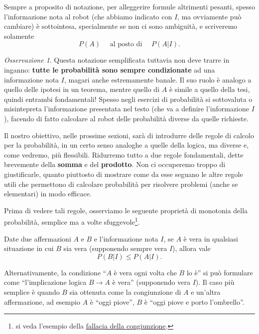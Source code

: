 \documentclass[
  italian,
  letterpaper,
]{book}
\theoremstyle{definition}
\theoremstyle{remark}
\newtheorem*{remark}{Osservazione}
\begin{document}
Sempre a proposito di notazione, per alleggerire formule altrimenti
pesanti, spesso l'informazione nota al robot (che abbiamo indicato con
\(I\), ma ovviamente può cambiare) è sottointesa, specialmente se non ci
sono ambiguità, e scriveremo solamente
\[ P(A) \quad \text{ al posto di } \quad  P(A|I).\]

\begin{remark}
Questa notazione semplificata tuttavia non deve trarre in inganno:
\textbf{tutte le probabilità sono sempre condizionate} ad una
informazione nota \(I\), magari anche estremamente banale. Il suo ruolo
è analogo a quello delle ipotesi in un teorema, mentre quello di \(A\) è
simile a quello della tesi, quindi entrambi fondamentali! Spesso negli
esercizi di probabilità si sottovaluta o misintepreta l'informazione
presentata nel testo (che va a definire l'informazione \(I\)), facendo
di fatto calcolare al robot delle probabilità diverse da quelle
richieste.
\end{remark}

Il nostro obiettivo, nelle prossime sezioni, sarà di introdurre delle
regole di calcolo per la probabilità, in un certo senso analoghe a
quelle della logica, ma diverse e, come vedremo, più flessibili.
Ridurremo tutto a due regole fondamentali, dette brevemente della
\textbf{somma} e del \textbf{prodotto}. Non ci occuperemo troppo di
giustificarle, quanto piuttosto di mostrare come da esse seguano le
altre regole utili che permettono di calcolare probabilità per risolvere
problemi (anche se elementari) in modo efficace.

Prima di vedere tali regole, osserviamo le seguente proprietà di
monotonia della probabilità, semplice ma a volte sfuggevole\footnote{si
  veda l'esempio della
  \href{http://maddmaths.simai.eu/divulgazione/fallacia-della-congiunzione/}{fallacia
  della congiunzione}.}.

Date due affermazioni \(A\) e \(B\) e l'informazione nota \(I\), se
\(A\) è vera in qualsiasi situazione in cui \(B\) sia vera (supponendo
sempre vera \(I\)), allora vale \[ P(B | I ) \le P(A | I ).\]

Alternativamente, la condizione ``\(A\) è vera ogni volta che \(B\) lo
è'' si può formulare come ``l'implicazione logica \(B \to A\) è vera''
(supponendo vera \(I\)). Il caso più semplice è quando \(B\) sia
ottenuta come la congiunzione di \(A\) e un'altra affermazione, ad
esempio \(A\) è ``oggi piove'', \(B\) è ``oggi piove e porto
l'ombrello''.
\end{document}
